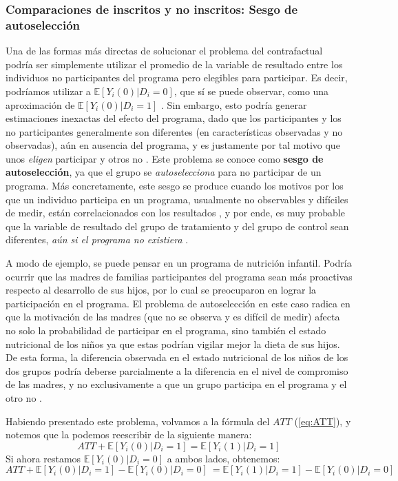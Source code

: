 \documentclass[../../main.tex]{subfiles}
\begin{document}
\subsubsection{Comparaciones de inscritos y no inscritos: Sesgo de autoselección}
Una de las formas más directas de solucionar el problema del contrafactual podría ser simplemente utilizar el promedio de la variable de resultado entre los individuos no participantes del programa pero elegibles para participar. Es decir, podríamos utilizar a \(\mathbb{E} \left[Y_i(0)|D_i=0\right]\), que sí se puede observar, como una aproximación de \(\mathbb{E} \left[Y_i(0)|D_i=1\right]\) \cite{bernal}. Sin embargo, esto podría generar estimaciones inexactas del efecto del programa, dado que los participantes y los no participantes generalmente son diferentes (en características observadas y no observadas), aún en ausencia del programa, y es justamente por tal motivo que unos \textit{eligen} participar y otros no \cite{bernal}. Este problema se conoce como \textbf{sesgo de autoselección}, ya que el grupo se \textit{autoselecciona} para no participar de un programa. Más concretamente, este sesgo se produce cuando los motivos por los que un individuo participa en un programa, usualmente no observables y difíciles de medir, están correlacionados con los resultados \cite{gertler-2016}, y por ende, es muy probable que la variable de resultado del grupo de tratamiento y del grupo de control sean diferentes, \textit{aún si el programa no existiera} \cite{bernal}.

A modo de ejemplo, se puede pensar en un programa de nutrición infantil. Podría ocurrir que las madres de familias participantes del programa sean más proactivas respecto al desarrollo de sus hijos, por lo cual se preocuparon en lograr la participación en el programa. El problema de autoselección en este caso radica en que la motivación de las madres (que no se observa y es difícil de medir) afecta no solo la probabilidad de participar en el programa, sino también el estado nutricional de los niños ya que estas podrían vigilar mejor la dieta de sus hijos. De esta forma, la diferencia observada en el estado nutricional de los niños de los dos grupos podría deberse parcialmente a la diferencia en el nivel de compromiso de las madres, y no exclusivamente a que un grupo participa en el programa y el otro no \cite{bernal}.

Habiendo presentado este problema, volvamos a la fórmula del \(ATT\) (\ref{eq:ATT}), y notemos que la podemos reescribir de la siguiente manera:
\begin{equation}
    ATT + \mathbb{E} \left[Y_i(0)|D_i=1\right] = \mathbb{E} \left[Y_i(1)|D_i=1\right] 
    \label{eq:ATT2}
\end{equation}
Si ahora restamos \(\mathbb{E} \left[Y_i(0)|D_i=0\right]\) a ambos lados, obtenemos:
\begin{equation}
    ATT + \mathbb{E} \left[Y_i(0)|D_i=1\right] - \mathbb{E} \left[Y_i(0)|D_i=0\right]\ = \mathbb{E} \left[Y_i(1)|D_i=1\right] - \mathbb{E} \left[Y_i(0)|D_i=0\right]\
    \label{eq:ATT3}
\end{equation}
\end{document}
